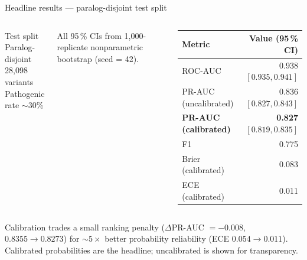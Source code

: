 \documentclass[aspectratio=169,10pt]{beamer}
\begin{document}

\begin{frame}{Headline results --- paralog-disjoint test split}
  \begin{columns}[T]
    \begin{block}{Test split}
      Paralog-disjoint\\
      28{,}098 variants\\
      Pathogenic rate $\sim$30\%
    \end{block}

    \footnotesize
    All 95\,\% CIs from 1{,}000-replicate nonparametric bootstrap
    (seed = 42).

    \centering
    \begin{tabular}{@{}l r@{}}
      \toprule
      \textbf{Metric}              & \textbf{Value (95\,\% CI)} \\
      \midrule
      ROC-AUC                      & 0.938 $[0.935, 0.941]$ \\
      PR-AUC (uncalibrated)        & 0.836 $[0.827, 0.843]$ \\
      \rowcolor{kkuGoldLight}
      \textbf{PR-AUC (calibrated)} & \textbf{0.827} $[0.819, 0.835]$ \\
      F1                           & 0.775 \\
      Brier (calibrated)           & 0.083 \\
      ECE (calibrated)             & 0.011 \\
      \bottomrule
    \end{tabular}
  \end{columns}

  \vspace{0.7em}
  \footnotesize
  Calibration trades a small ranking penalty
  ($\Delta$PR-AUC $= -0.008$, $0.8355 \to 0.8273$) for $\sim$$5\times$
  better probability reliability (ECE $0.054 \to 0.011$).
  Calibrated probabilities are the headline; uncalibrated is shown for
  transparency.
\end{frame}
\end{document}
